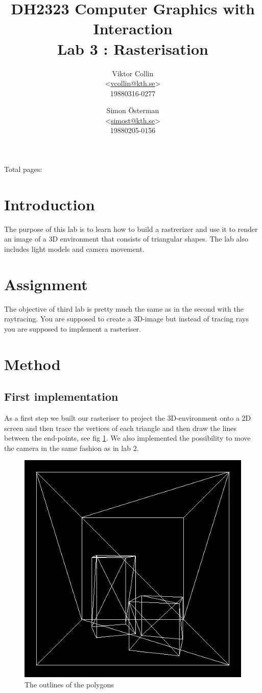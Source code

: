 \documentclass[a4paper,11pt]{article}
\author{Viktor Collin \\ <\url{vcollin@kth.se}> \\ 19880316-0277 \and Simon \"{O}sterman \\ <\url{simost@kth.se}> \\ 19880205-0156}
\title{\textbf{DH2323 Computer Graphics with Interaction \\ Lab 3 : Rasterisation}}
\begin{document}
\maketitle
\begin{center}
Total pages: \pageref{LastPage}
\end{center}
\thispagestyle{empty}

\clearpage
\setcounter{page}{1}
\section{Introduction}
The purpose of this lab is to learn how to build a rastrerizer and use it to render an image of a 3D environment that consists of triangular shapes. The lab also includes light models and camera movement. 
\section{Assignment}
The objective of third lab is pretty much the same as in the second with the raytracing. You are supposed to create a 3D-image but instead of tracing rays you are supposed to implement a rasteriser.
\section{Method}
\subsection{First implementation}
As a first step we built our rasteriser to project the 3D-environment onto a 2D screen and then trace the vertices of each triangle and then draw the lines between the end-points, see fig \ref{fig1}. We also implemented the possibility to move the camera in the same fashion as in lab 2. 

\begin{figure}[h!]
	\centering	
	\includegraphics[width=0.4\linewidth]{screenshot1.png}
	\caption{The outlines of the polygons}
	\label{fig1}
\end{figure}
\clearpage
\end{document}
